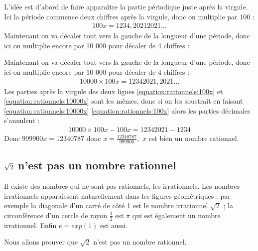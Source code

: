 \documentclass[letterpaper,10pt,french]{jupyterBook}
\begin{document}
\sphinxAtStartPar
L’idée est d’abord de faire apparaître la partie périodique juste après la virgule. Ici la période commence deux chiffres après la virgule, donc on multiplie par 100 :
\begin{equation}\label{equation:rationnels:100x}
\begin{split}
100x=1234,2021 2021 \ldots
\end{split}
\end{equation}
\sphinxAtStartPar
Maintenant on va décaler tout vers la gauche de la longueur d’une période, donc ici on multiplie encore par 10 000 pour décaler de 4 chiffres :

\sphinxAtStartPar
Maintenant on va décaler tout vers la gauche de la longueur d’une période, donc ici on multiplie encore par 10 000 pour décaler de 4 chiffres :
\begin{equation}\label{equation:rationnels:10000x}
\begin{split}
10 000\times 100x= 1234 2021, 2021 \ldots
\end{split}
\end{equation}
\sphinxAtStartPar
Les parties après la virgule des deux lignes \eqref{equation:rationnels:100x} et \eqref{equation:rationnels:10000x} sont les mêmes, donc si on les soustrait en faisant \eqref{equation:rationnels:10000x} \sphinxhyphen{} \eqref{equation:rationnels:100x} alors les parties décimales s’annulent :
\begin{equation*}
\begin{split}
10 000 \times 100x-100x = 12 342 021-1234
\end{split}
\end{equation*}
\sphinxAtStartPar
Donc \(999 900x = 12 340 787\) donc \(x=\frac{12 340 787}{999 900},\) \(x\) est bien un nombre rationnel.


\subsection{\protect\(\sqrt{2}\protect\) n’est pas un nombre rationnel}
\label{\detokenize{rationnels:sqrt-2-n-est-pas-un-nombre-rationnel}}
\sphinxAtStartPar
Il existe des nombres qui ne sont pas rationnels, les irrationnels. Les nombres irrationnels apparaissent naturellement dans les figures géométriques : par exemple la diagonale d’un carré de côté 1 est le nombre irrationnel \(\sqrt{2}\) ; la circonférence d’un cercle de rayon \(\frac{1}{2}\) est \(\pi\) qui est également un nombre irrationnel. Enfin \(e = exp(1)\) est aussi.

\sphinxAtStartPar
Nous allons prouver que \(\sqrt{2}\) n’est pas un nombre rationnel.
\end{document}
